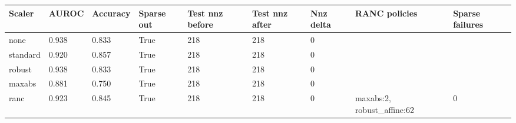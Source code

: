 \begin{tabular}{lllllllll}
\toprule
Scaler & AUROC & Accuracy & Sparse out & Test nnz before & Test nnz after & Nnz delta & RANC policies & Sparse failures \\
\midrule
none & 0.938 & 0.833 & True & 218 & 218 & 0 &  &  \\
standard & 0.920 & 0.857 & True & 218 & 218 & 0 &  &  \\
robust & 0.938 & 0.833 & True & 218 & 218 & 0 &  &  \\
maxabs & 0.881 & 0.750 & True & 218 & 218 & 0 &  &  \\
ranc & 0.923 & 0.845 & True & 218 & 218 & 0 & maxabs:2, robust\_affine:62 & 0 \\
\bottomrule
\end{tabular}
